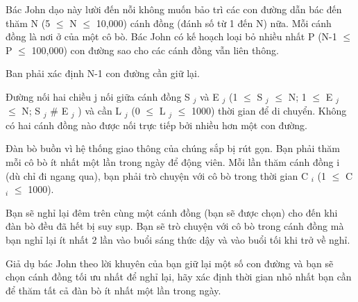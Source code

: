 Bác John dạo này lười đến nỗi không muốn bảo trì các con đường dẫn bác đến thăm N (5  $\le$  N  $\le$  10,000) cánh đồng (đánh số từ 1 đến N) nữa. Mỗi cánh đồng là nơi ở của một cô bò. Bác John có kế hoạch loại bỏ nhiều nhất P (N-1  $\le$  P  $\le$  100,000) con đường sao cho các cánh đồng vẫn liên thông.  

   Ban phải xác định N-1 con đường cần giữ lại.  

   Đường nối hai chiều j nối giữa cánh đồng S   $_    j   $   và E   $_    j   $   (1  $\le$  S   $_    j   $    $\le$  N; 1  $\le$  E   $_    j   $    $\le$  N; S   $_    j   $   \# E   $_    j   $   ) và cần L   $_    j   $   (0  $\le$  L   $_    j   $    $\le$  1000) thời gian để di chuyển. Không có hai cánh đồng nào được nối trực tiếp bởi nhiều hơn một con đường.  

   Đàn bò buồn vì hệ thống giao thông của chúng sắp bị rút gọn. Bạn phải thăm mỗi cô bò ít nhất một lần trong ngày để động viên. Mỗi lần thăm cánh đồng i (dù chỉ đi ngang qua), bạn phải trò chuyện với cô bò trong thời gian C   $_    i   $   (1  $\le$  C   $_    i   $    $\le$  1000).  

   Bạn sẽ nghỉ lại đêm trên cùng một cánh đồng (bạn sẽ được chọn) cho đến khi đàn bò đều đã hết bị suy sụp. Bạn sẽ trò chuyện với cô bò trong cánh đồng mà bạn nghỉ lại ít nhất 2 lần vào buổi sáng thức dậy và vào buổi tối khi trở về nghỉ.  

   Giả dụ bác John theo lời khuyên của bạn giữ lại một số con đường và bạn sẽ chọn cánh đồng tối ưu nhất để nghỉ lại, hãy xác định thời gian nhỏ nhất bạn cần để thăm tất cả đàn bò ít nhất một lần trong ngày.  

\